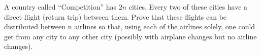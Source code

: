 A country called ``Competition'' has $2n$ cities. Every two of these cities have a direct flight (return
trip) between them. Prove that these flights can be distributed between n airlines so that, using each of
the airlines solely, one could get from any city to any other city (possibly with airplane changes but no
airline changes).